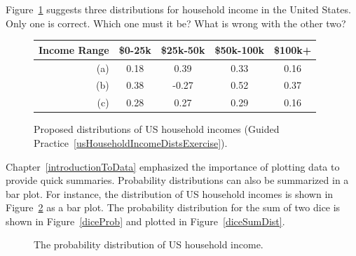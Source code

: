 \begin{exercisewrap}
\begin{nexercise}\label{usHouseholdIncomeDistsExercise}
Figure~\ref{usHouseholdIncomeDists} suggests three distributions for household income in the United States. Only one is correct. Which one must it be? What is wrong with the other two?\footnotemark
\end{nexercise}
\end{exercisewrap}

\begin{figure}[h]
\centering
\begin{tabular}{r | cc cc}
  \hline
Income Range & \$0-25k & \$25k-50k & \$50k-100k & \$100k+ \\
  \hline
(a)\hspace{0.2mm}	 & 0.18 & 0.39 & 0.33 & 0.16 \\
(b)				 & 0.38 & -0.27 & 0.52 & 0.37 \\
(c)\hspace{0.2mm}	 & 0.28 & 0.27 & 0.29 & 0.16 \\
  \hline
\end{tabular}
\caption{Proposed distributions of US household incomes (Guided Practice~\ref{usHouseholdIncomeDistsExercise}).}
\label{usHouseholdIncomeDists}
\end{figure}

Chapter~\ref{introductionToData} emphasized the importance of plotting data to provide quick summaries. Probability distributions can also be summarized in a bar plot. For instance, the distribution of US household incomes is shown in Figure~\ref{usHouseholdIncomeDistBar} as a bar plot. %
The probability distribution for the sum of two dice is shown in Figure~\ref{diceProb} and plotted in Figure~\ref{diceSumDist}.

\begin{figure}[h]
  \centering
  \caption{The probability distribution of US household income.}
  \label{usHouseholdIncomeDistBar}
\end{figure}

